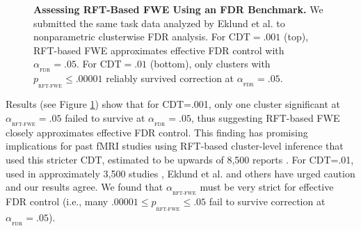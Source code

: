 \documentclass[9pt,twocolumn,twoside]{pnas-new}
\newcommand{\subtext}[2]{
#1_{_{\text{#2}}}
}
\begin{document}
\begin{figure}[ht]
\centering
\caption{
\textbf{Assessing RFT-Based FWE Using an FDR Benchmark.}
We submitted the same task data analyzed by Eklund et al. \cite{eklund_cluster_2016,tom_neural_2007,poldrack_toward_2013} to nonparametric clusterwise FDR analysis. For $\text{CDT}=.001$ (top), RFT-based FWE approximates effective FDR control with $\subtext{\alpha}{FDR} = .05$. For $\text{CDT}=.01$ (bottom), only clusters with $\subtext{p}{RFT-FWE} \leq .00001$ reliably survived correction at $\subtext{\alpha}{FDR}=.05$. 
\label{fig:p-plot}
}
\end{figure}

Results (see Figure \ref{fig:p-plot}) show that for CDT=.001, only one cluster significant at $\subtext{\alpha}{RFT-FWE} = .05$ failed to survive at $\subtext{\alpha}{FDR} = .05$, thus suggesting RFT-based FWE closely approximates effective FDR control.
This finding has promising implications for past fMRI studies using RFT-based cluster-level inference that used this stricter CDT, estimated to be upwards of 8,500 reports \cite{nichols_bibliometrics_2016,woo_cluster-extent_2014}.
For CDT=.01, used in approximately 3,500 studies \cite{nichols_bibliometrics_2016,woo_cluster-extent_2014}, Eklund et al. and others \cite{flandin_analysis_2016} have urged caution and our results agree. We found that $\subtext{\alpha}{RFT-FWE}$ must be very strict for effective FDR control (i.e., many $.00001 \leq \subtext{p}{RFT-FWE} \leq .05$ fail to survive correction at $\subtext{\alpha}{FDR}=.05$).
\end{document}
